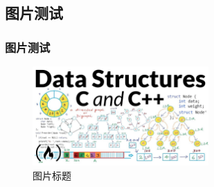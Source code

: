 \documentclass[12pt]{beamer}
\begin{document}
\subsection{图片测试}
\begin{frame}
    \frametitle{图片测试}

        \begin{figure}[H] %
        \centering %
        \includegraphics[width=0.6\textwidth]{assets/dataStructures.jpg}
        \captionsetup{font = scriptsize}  %
        \caption{图片标题} %
        \label{fig: 数据结构2} %
    \end{figure}
\end{frame}

\end{document}
